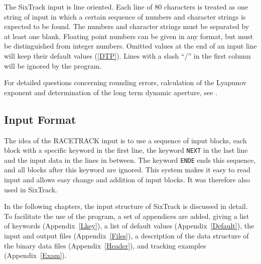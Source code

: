The SixTrack input is line oriented.
Each line of 80 characters is treated as one string of input in which a certain sequence of numbers and character strings is expected to be found.
The numbers and character strings must be separated by at least one blank.
Floating point numbers can be given in any format, but must be distinguished from integer numbers.
Omitted values at the end of an input line will keep their default values (\ref{DTP}).
Lines with a slash ``/'' in the first column will be ignored by the program.

For detailed questions concerning rounding errors, calculation of the Lyapunov exponent and determination of the long term dynamic aperture, see \cite{thesis}.

\subsection{Input Format}

The idea of the RACETRACK input is to use a sequence of input blocks, each block with a specific keyword in the first line, the keyword \texttt{NEXT} in the last line and the input data in the lines in between.
The keyword \texttt{ENDE} ends this sequence, and all blocks after this keyword are ignored.
This system makes it easy to read input and allows easy change and addition of input blocks. It was therefore also used in SixTrack\@.

In the following chapters, the input structure of SixTrack is discussed in detail.
To facilitate the use of the program, a set of appendices are added, giving a list of keywords \mbox{(Appendix~\ref{Lkey}),} a list of default values \mbox{(Appendix~\ref{Default}),} the input and output files \mbox{(Appendix~\ref{Files}),} a description of the data structure of the binary data files \mbox{(Appendix~\ref{Header}),} and tracking examples \mbox{(Appendix~\ref{Exam}).}

